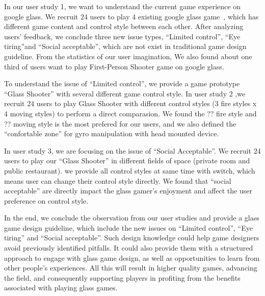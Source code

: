 In our user study 1, we want to understand the current game experience on google glass. We recruit 24 users to play 4 existing google glass game~\cite{minigame}, which has different game content and control style between each other. After analyzing users' feedback, we conclude three new issue types, ``Limited control'', ``Eye tiring''and ``Social acceptable'', which are not exist in traditional game design guideline. From the statistics of our user imagination, We also found about one third of users want to play First-Person Shooter game on google glass.

To understand the issue of ``Limited control'', we provide a game prototype ``Glass Shooter'' with several different game control style. In user study 2 ,we recruit 24 users to play Glass Shooter with different control styles (3 fire styles x 4 moving styles) to perform a direct comparasion. We found the ?? fire style and ?? moving style is the most prefered for our users, and we also defined the ``confortable zone'' for gyro manipulation with head mounted device.

In user study 3, we are focusing on the issue of ``Social Acceptable''. We recruit 24 users to play our ``Glass Shooter'' in different fields of space (private room and public restaurant). we provide all control styles at same time with switch, which means user can change their control style directly. We found that ``social acceptable'' are directly impact the glass gamer's enjoyment and affect the user preference on control style.

In the end, we conclude the observation from our user studies and provide a glass game design guideline, which include the new issues on ``Limited control'', ``Eye tiring'' and ``Social acceptable''. Such design knowledge could help game designers avoid previously identified pitfalls. It could also provide them with a structured approach to engage with glass game design, as well as opportunities to learn from other people’s experiences. All this will result in higher quality games, advancing the field, and consequently supporting players in profiting from the benefits associated with playing glass games.


